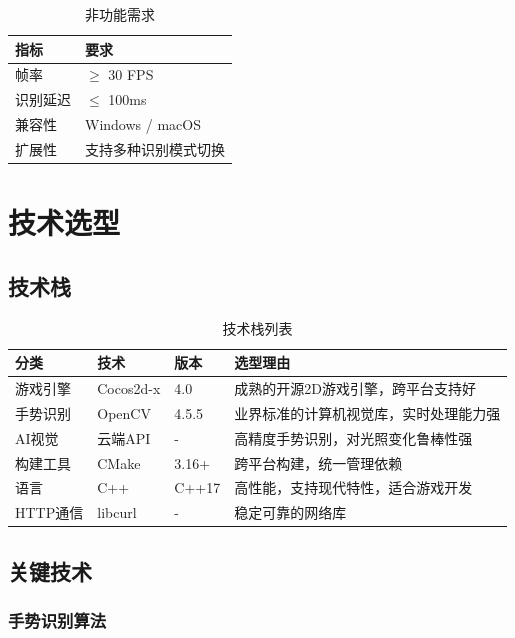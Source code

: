 \documentclass{article}
\begin{document}
\begin{table}[H]
\centering
\begin{tabular}{|l|l|}
\hline
\textbf{指标} & \textbf{要求} \\
\hline
帧率 & $\geq$ 30 FPS \\
\hline
识别延迟 & $\leq$ 100ms \\
\hline
兼容性 & Windows / macOS \\
\hline
扩展性 & 支持多种识别模式切换 \\
\hline
\end{tabular}
\caption{非功能需求}
\end{table}

\newpage

\section{技术选型}

\subsection{技术栈}

\begin{table}[H]
\centering
\small
\begin{tabular}{|l|l|l|l|}
\hline
\textbf{分类} & \textbf{技术} & \textbf{版本} & \textbf{选型理由} \\
\hline
游戏引擎 & Cocos2d-x & 4.0 & 成熟的开源2D游戏引擎，跨平台支持好 \\
\hline
手势识别 & OpenCV & 4.5.5 & 业界标准的计算机视觉库，实时处理能力强 \\
\hline
AI视觉 & 云端API & - & 高精度手势识别，对光照变化鲁棒性强 \\
\hline
构建工具 & CMake & 3.16+ & 跨平台构建，统一管理依赖 \\
\hline
语言 & C++ & C++17 & 高性能，支持现代特性，适合游戏开发 \\
\hline
HTTP通信 & libcurl & - & 稳定可靠的网络库 \\
\hline
\end{tabular}
\caption{技术栈列表}
\end{table}

\subsection{关键技术}

\subsubsection{手势识别算法}
\end{document}
